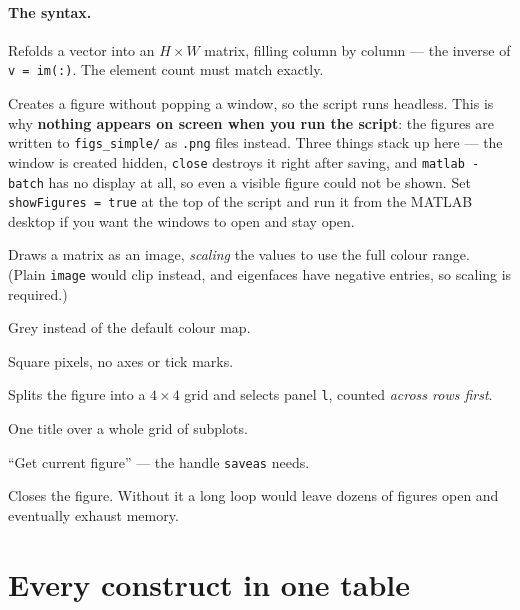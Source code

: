 \paragraph{The syntax.}
\begin{description}[leftmargin=*,style=nextline,nosep]
\item[\texttt{reshape(v,H,W)}] Refolds a vector into an $H\times W$ matrix,
  filling column by column --- the inverse of \texttt{v = im(:)}. The element
  count must match exactly.
\item[\texttt{figure('Visible','off')}] Creates a figure without popping a
  window, so the script runs headless. This is why \textbf{nothing appears on
  screen when you run the script}: the figures are written to
  \texttt{figs\_simple/} as \texttt{.png} files instead. Three things stack up
  here --- the window is created hidden, \texttt{close} destroys it right after
  saving, and \texttt{matlab -batch} has no display at all, so even a visible
  figure could not be shown. Set \texttt{showFigures = true} at the top of the
  script and run it from the MATLAB desktop if you want the windows to open and
  stay open.
\item[\texttt{imagesc(A)}] Draws a matrix as an image, \emph{scaling} the
  values to use the full colour range. (Plain \texttt{image} would clip
  instead, and eigenfaces have negative entries, so scaling is required.)
\item[\texttt{colormap gray}] Grey instead of the default colour map.
\item[\texttt{axis image off}] Square pixels, no axes or tick marks.
\item[\texttt{subplot(4,4,l)}] Splits the figure into a $4\times4$ grid and
  selects panel \texttt{l}, counted \emph{across rows first}.
\item[\texttt{sgtitle}] One title over a whole grid of subplots.
\item[\texttt{gcf}] ``Get current figure'' --- the handle \texttt{saveas} needs.
\item[\texttt{close}] Closes the figure. Without it a long loop would leave
  dozens of figures open and eventually exhaust memory.
\end{description}

\section{Every construct in one table}
\label{sec:syntaxtable}


